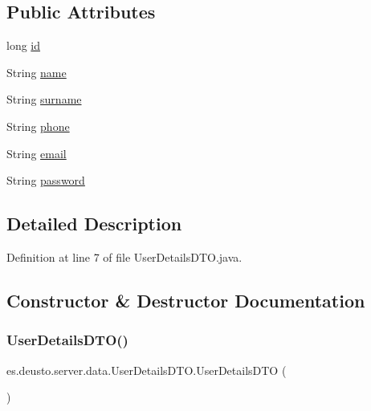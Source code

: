 \subsection*{Public Attributes}
\begin{DoxyCompactItemize}
\item 
long \mbox{\hyperlink{classes_1_1deusto_1_1server_1_1data_1_1_user_details_d_t_o_a5f54dc128e6dc54bcd889e220d2b635e}{id}}
\item 
String \mbox{\hyperlink{classes_1_1deusto_1_1server_1_1data_1_1_user_details_d_t_o_a5ed08eaa3f11b469cec38f4e00b1d770}{name}}
\item 
String \mbox{\hyperlink{classes_1_1deusto_1_1server_1_1data_1_1_user_details_d_t_o_a330072900fcfa1074bfd830396b42fd3}{surname}}
\item 
String \mbox{\hyperlink{classes_1_1deusto_1_1server_1_1data_1_1_user_details_d_t_o_a02645a69a61019b6ef72367320d6c2ca}{phone}}
\item 
String \mbox{\hyperlink{classes_1_1deusto_1_1server_1_1data_1_1_user_details_d_t_o_a669506e7fff75d8d85e335629441e1c6}{email}}
\item 
String \mbox{\hyperlink{classes_1_1deusto_1_1server_1_1data_1_1_user_details_d_t_o_a98c10832def6c14ba125dd9191789658}{password}}
\end{DoxyCompactItemize}


\subsection{Detailed Description}


Definition at line 7 of file User\+Details\+D\+T\+O.\+java.



\subsection{Constructor \& Destructor Documentation}
\mbox{\label{classes_1_1deusto_1_1server_1_1data_1_1_user_details_d_t_o_ac079ed52a730b1c55f989bfd41f51ddb}} 
\subsubsection{\texorpdfstring{UserDetailsDTO()}{UserDetailsDTO()}\hspace{0.1cm}{\footnotesize\ttfamily [1/2]}}
{\footnotesize\ttfamily es.\+deusto.\+server.\+data.\+User\+Details\+D\+T\+O.\+User\+Details\+D\+TO (\begin{DoxyParamCaption}{ }\end{DoxyParamCaption})}



